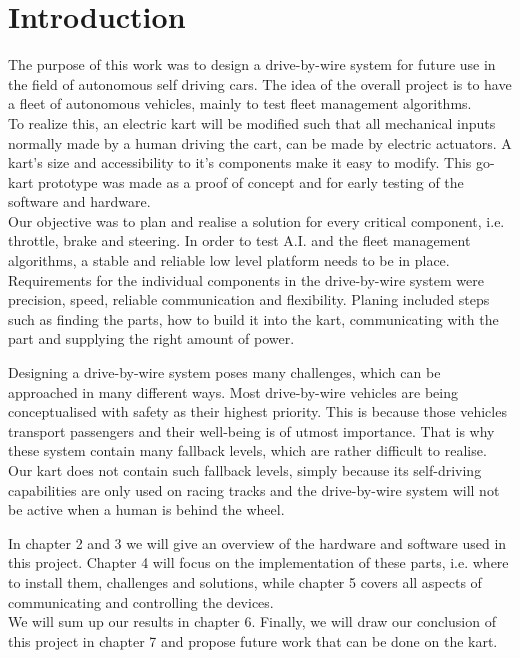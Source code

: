 
\chapter{Introduction}
\label{chp:Introduction}


The purpose of this work was to design a drive-by-wire system for future use in the field of autonomous self driving cars. The idea of the overall project is to have a fleet of autonomous vehicles, mainly to test fleet management algorithms. \\%
To realize this, an electric kart will be modified such that all mechanical inputs normally made by a human driving the cart, can be made by electric actuators. A kart's size and accessibility to it's components make it easy to modify. This go-kart prototype was made as a proof of concept and for early testing of the software and hardware.\\
Our objective was to plan and realise a solution for every critical component, i.e. throttle, brake and steering. In order to test A.I. and the fleet management algorithms, a stable and reliable low level platform needs to be in place. Requirements for the individual components in the drive-by-wire system were precision, speed, reliable communication and flexibility. Planing included steps such as finding the parts, how to build it into the kart, communicating with the part and supplying the right amount of power.

Designing a drive-by-wire system poses many challenges, which can be approached in many different ways. Most drive-by-wire vehicles are being conceptualised with safety as their highest priority. This is because those vehicles transport passengers and their well-being is of utmost importance. That is why these system contain many fallback levels, which are rather difficult to realise. Our kart does not contain such fallback levels, simply because its self-driving capabilities are only used on racing tracks and the drive-by-wire system will not be active when a human is behind the wheel. 

In chapter 2 and 3 we will give an overview of the hardware and software used in this project. Chapter 4 will focus on the implementation of these parts, i.e. where to install them, challenges and solutions, while chapter 5 covers all aspects of communicating and controlling the devices.\\
We will sum up our results in chapter 6. Finally, we will draw our conclusion of this project in chapter 7 and propose future work that can be done on the kart.

